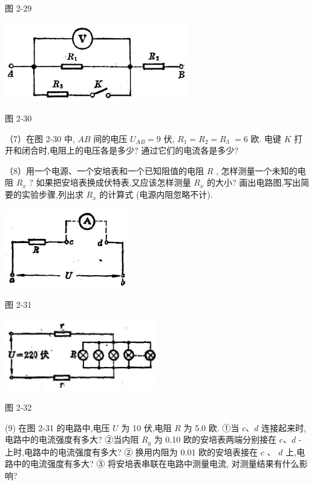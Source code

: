 \documentclass[10pt]{article}
\begin{document}
图 2-29

\begin{center}
\includegraphics[max width=0.6\textwidth]{images/01913056-1f15-74d8-9184-9aab52c9d66b_100_956660.jpg}
\end{center}

图 2-30

（7）在图 2-30 中, \({AB}\) 间的电压 \({U}_{AB} = 9\) 伏, \({R}_{1} = {R}_{2} = {R}_{3}\) \(= 6\) 欧. 电键 \(K\) 打开和闭合时,电阻上的电压各是多少? 通过它们的电流各是多少?

（8）用一个电源、一个安培表和一个已知阻值的电阻 \(R\) , 怎样测量一个未知的电阻 \({R}_{x}\) ? 如果把安培表换成伏特表,又应该怎样测量 \({R}_{x}\) 的大小? 画出电路图,写出简要的实验步骤,列出求 \({R}_{x}\) 的计算式 (电源内阻忽略不计).

\begin{center}
\includegraphics[max width=0.4\textwidth]{images/01913056-1f15-74d8-9184-9aab52c9d66b_101_690532.jpg}
\end{center}

图 2-31

\begin{center}
\includegraphics[max width=0.5\textwidth]{images/01913056-1f15-74d8-9184-9aab52c9d66b_101_747971.jpg}
\end{center}

图 2-32

(9) 在图 2-31 的电路中,电压 \(U\) 为 10 伏,电阻 \(R\) 为 5.0 欧. ①当 \(c\text{、}d\) 连接起来时,电路中的电流强度有多大? ②当内阻 \({R}_{g}\) 为 0.10 欧的安培表两端分别接在 \(c\text{、}d\) -上时,电路中的电流强度有多大? ② 换用内阻为 0.01 欧的安培表接在 \(c\) 、 \(d\) 上,电路中的电流强度有多大? ③ 将安培表串联在电路中测量电流, 对测量结果有什么影响?
\end{document}

